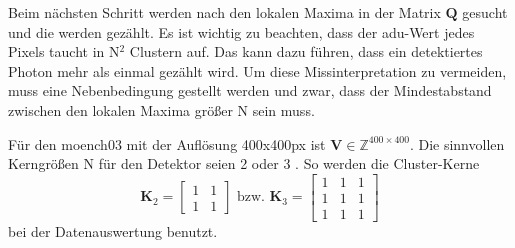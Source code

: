 \noindent
Beim nächsten Schritt werden nach den lokalen Maxima in der Matrix $\mathbf{Q}$ gesucht und die werden gezählt. Es ist wichtig zu beachten, dass der \gls{adu}-Wert jedes Pixels taucht in N$^2$ Clustern auf. Das kann dazu führen, dass ein detektiertes Photon mehr als einmal gezählt wird. Um diese Missinterpretation zu vermeiden, muss eine Nebenbedingung gestellt werden und zwar, dass der Mindestabstand zwischen den lokalen Maxima größer N sein muss.

\noindent
Für den \gls{moench03} mit der Auflösung 400x400px ist $\mathbf{V} \in \mathbb{Z}^{400\times 400}$. Die sinnvollen Kerngrößen N für den Detektor seien 2 oder 3  \cite[Abschnitt 4]{cartier_micron_2014}. So werden die Cluster-Kerne
\begin{equation}
    \mathbf{K}_{2} = \begin{bmatrix}
1 & 1\\
1 & 1
\end{bmatrix}
\text{ bzw. }
    \mathbf{K}_{3} = \begin{bmatrix}
1 & 1 & 1\\
1 & 1 & 1\\
1 & 1 & 1
\end{bmatrix}
\end{equation}
bei der Datenauswertung benutzt.